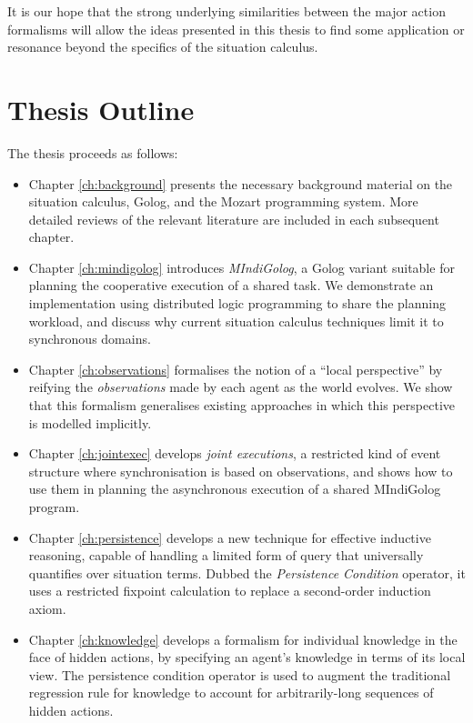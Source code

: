 It is our hope that the strong underlying similarities between the
major action formalisms will allow the ideas presented in this thesis
to find some application or resonance beyond the specifics of the
situation calculus.\newpage{}


\section{Thesis Outline}

The thesis proceeds as follows:

\begin{itemize}
\item Chapter \ref{ch:background} presents the necessary background material
on the situation calculus, Golog, and the Mozart programming system.
More detailed reviews of the relevant literature are included in each
subsequent chapter. 
\item Chapter \ref{ch:mindigolog} introduces \emph{MIndiGolog}, a Golog
variant suitable for planning the cooperative execution of a shared
task\emph{.} We demonstrate an implementation using distributed logic
programming to share the planning workload, and discuss why current
situation calculus techniques limit it to synchronous domains. 
\item Chapter \ref{ch:observations} formalises the notion of a {}``local
perspective'' by reifying the \emph{observations} made by each agent
as the world evolves. We show that this formalism generalises existing
approaches in which this perspective is modelled implicitly. 
\item Chapter \ref{ch:jointexec} develops \emph{joint executions}, a restricted
kind of event structure where synchronisation is based on observations,
and shows how to use them in planning the asynchronous execution of
a shared MIndiGolog program. 
\item Chapter \ref{ch:persistence} develops a new technique for effective
inductive reasoning, capable of handling a limited form of query that
universally quantifies over situation terms. Dubbed the \emph{Persistence
Condition} operator, it uses a restricted fixpoint calculation to
replace a second-order induction axiom. 
\item Chapter \ref{ch:knowledge} develops a formalism for individual knowledge
in the face of hidden actions, by specifying an agent's knowledge
in terms of its local view. The persistence condition operator is
used to augment the traditional regression rule for knowledge to account
for arbitrarily-long sequences of hidden actions. 

\end{itemize}
